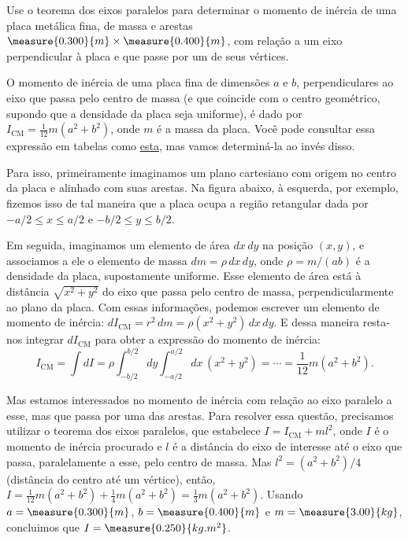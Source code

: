\begin{question}
    Use o teorema dos eixos paralelos para determinar o momento de inércia de uma placa metálica fina, de massa  e arestas $\measure{0.300}{m}\times \measure{0.400}{m}$, com relação a um eixo perpendicular à placa e que passe por um de seus vértices.

    \begin{answer}
    \end{answer}

    \begin{solution}
      O momento de inércia de uma placa fina de dimensões $a$ e $b$, perpendiculares ao eixo que passa pelo centro de massa (e que coincide com o centro geométrico, supondo que a densidade da placa seja uniforme), é dado por $I_{\text{CM}} = \frac{1}{12} m (a^2 + b^2)$, onde $m$ é a massa da placa.
      Você pode consultar essa expressão em tabelas como \href{https://en.wikipedia.org/wiki/List_of_moments_of_inertia}{esta}, mas vamos determiná-la ao invés disso.

      Para isso, primeiramente imaginamos um plano cartesiano com origem no centro da placa e alinhado com suas arestas.
      Na figura abaixo, à esquerda, por exemplo, fizemos isso de tal maneira que a placa ocupa a região retangular dada por $-a/2 \le x \le a/2$ e $-b/2 \le y \le b/2$.


      Em seguida, imaginamos um elemento de área $dx\,dy$ na posição $(x,y)$, e associamos a ele o elemento de massa $dm = \rho\, dx\,dy$, onde $\rho = m/(ab)$ é a densidade da placa, supostamente uniforme.
      Esse elemento de área está à distância $\sqrt{x^2 + y^2}$ do eixo que passa pelo centro de massa, perpendicularmente ao plano da placa.
      Com essas informações, podemos escrever um elemento de momento de inércia: $dI_{\text{CM}} = r^2\, dm = \rho (x^2 + y^2)\, dx\, dy$.
      E dessa maneira resta-nos integrar $dI_{\text{CM}}$ para obter a expressão do momento de inércia:
      \begin{equation*}
        I_{\text{CM}} = \int dI = \rho \int_{-b/2}^{b/2} dy \int_{-a/2}^{a/2} dx\, (x^2 + y^2) = \cdots = \frac{1}{12} m (a^2 + b^2).
      \end{equation*}

      Mas estamos interessados no momento de inércia com relação ao eixo paralelo a esse, mas que passa por uma das arestas.
      Para resolver essa questão, precisamos utilizar o teorema dos eixos paralelos, que estabelece $I = I_{\text{CM}} + ml^2$, onde $I$ é o momento de inércia procurado e $l$ é a distância do eixo de interesse até o eixo que passa, paralelamente a esse, pelo centro de massa.
      Mas $l^2 = (a^2 + b^2)/4$ (distância do centro até um vértice), então, $I = \frac{1}{12} m (a^2 + b^2) + \frac{1}{4} m(a^2 + b^2) = \frac{1}{3} m (a^2 + b^2)$.
      Usando $a = \measure{0.300}{m}$, $b = \measure{0.400}{m}$ e $m = \measure{3.00}{kg}$, concluimos que $I = \measure{0.250}{kg.m^2}$.


\end{solution}
\end{question}
